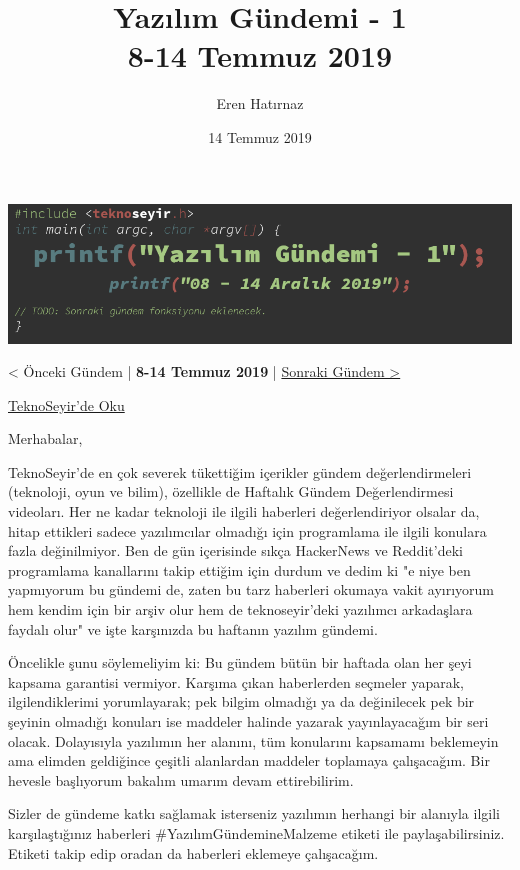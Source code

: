 \documentclass[11pt]{article}
\author{Eren Hatırnaz}
\date{14 Temmuz 2019}
\title{Yazılım Gündemi - 1\\\medskip
\large 8-14 Temmuz 2019}
\begin{document}
\maketitle
\tableofcontents \clearpage\shorthandoff{=}

\begin{center}
\includegraphics[width=.9\linewidth]{gorseller/yazilim-gundemi-banner.png}
\end{center}
\begin{center}
< Önceki Gündem | \textbf{8-14 Temmuz 2019} | \href{../02/yazilim-gundemi-02.pdf}{Sonraki Gündem >}

\href{https://teknoseyir.com/blog/yazilim-gundemi-1-08-14-temmuz-2019}{TeknoSeyir'de Oku}
\end{center}

Merhabalar,

TeknoSeyir'de en çok severek tükettiğim içerikler gündem değerlendirmeleri
(teknoloji, oyun ve bilim), özellikle de Haftalık Gündem Değerlendirmesi
videoları. Her ne kadar teknoloji ile ilgili haberleri değerlendiriyor olsalar
da, hitap ettikleri sadece yazılımcılar olmadığı için programlama ile ilgili
konulara fazla değinilmiyor. Ben de gün içerisinde sıkça HackerNews ve
Reddit'deki programlama kanallarını takip ettiğim için durdum ve dedim ki "e niye
ben yapmıyorum bu gündemi de, zaten bu tarz haberleri okumaya vakit ayırıyorum
hem kendim için bir arşiv olur hem de teknoseyir'deki yazılımcı arkadaşlara
faydalı olur" ve işte karşınızda bu haftanın yazılım gündemi.

Öncelikle şunu söylemeliyim ki: Bu gündem bütün bir haftada olan her şeyi kapsama
garantisi vermiyor. Karşıma çıkan haberlerden seçmeler yaparak, ilgilendiklerimi
yorumlayarak; pek bilgim olmadığı ya da değinilecek pek bir şeyinin olmadığı
konuları ise maddeler halinde yazarak yayınlayacağım bir seri olacak. Dolayısıyla
yazılımın her alanını, tüm konularını kapsamamı beklemeyin ama elimden geldiğince
çeşitli alanlardan maddeler toplamaya çalışacağım. Bir hevesle başlıyorum bakalım
umarım devam ettirebilirim.

Sizler de gündeme katkı sağlamak isterseniz yazılımın herhangi bir alanıyla
ilgili karşılaştığınız haberleri \#YazılımGündemineMalzeme etiketi ile
paylaşabilirsiniz. Etiketi takip edip oradan da haberleri eklemeye çalışacağım.
\end{document}
